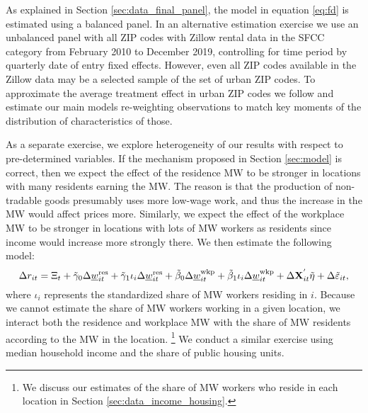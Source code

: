 As explained in Section \ref{sec:data_final_panel}, 
the model in equation \eqref{eq:fd} is estimated using a balanced panel.
In an alternative estimation exercise we use an unbalanced panel with all 
ZIP codes with Zillow rental data in the SFCC category 
from February 2010 to December 2019, controlling for time period by 
quarterly date of entry fixed effects.
However, even all ZIP codes available in the Zillow data may be 
a selected sample of the set of urban ZIP codes.
To approximate the average treatment effect in urban ZIP codes we follow
\textcite{Hainmueller2012} and estimate our main models re-weighting 
observations to match key moments of the distribution of characteristics of 
those.

As a separate exercise, we explore heterogeneity of our results with respect
to pre-determined variables.
If the mechanism proposed in Section \ref{sec:model} is correct, then we
expect the effect of the residence MW to be stronger in locations with many 
residents earning the MW.
The reason is that the production of non-tradable goods presumably uses more
low-wage work, and thus the increase in the MW would affect prices more.
Similarly, we expect the effect of the workplace MW to be stronger in locations
with lots of MW workers as residents since income would increase more 
strongly there.
We then estimate the following model:
\begin{equation}\label{eq:fd_heterogeneity}
    \Delta r_{it} = \Xi_t
                  + \tilde\gamma_0 \Delta \underline{w}^{\text{res}}_{it}
                  + \tilde\gamma_1 \iota_i \Delta \underline{w}^{\text{res}}_{it}
                  + \tilde\beta_0 \Delta \underline{w}^{\text{wkp}}_{it}
                  + \tilde\beta_1 \iota_i \Delta \underline{w}^{\text{wkp}}_{it}
                  + \Delta \mathbf{X}^{'}_{it}\tilde\eta
                  + \Delta \tilde\varepsilon_{it} ,
\end{equation}
where $\iota_i$ represents the standardized share of MW workers residing in $i$.
Because we cannot estimate the share of MW workers working in a given location,
we interact both the residence and workplace MW with the share of MW residents
according to the MW in the location.%
\footnote{We discuss our estimates of the share of MW workers who reside in each 
location in Section \ref{sec:data_income_housing}.}
We conduct a similar exercise using median household income and the share of 
public housing units.
